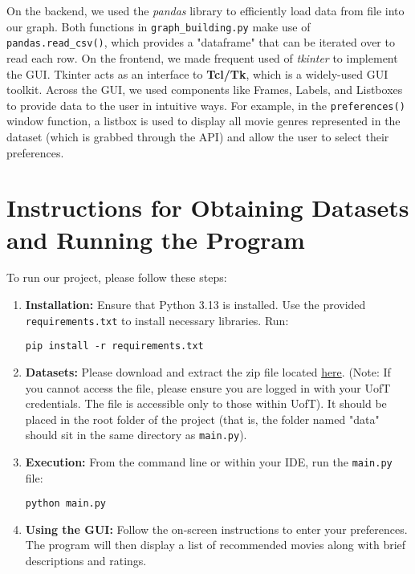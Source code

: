 \documentclass[12pt]{article}
\begin{document}
On the backend, we used the \textit{pandas} library to efficiently load data from file into our graph. Both functions in \texttt{graph\_building.py} make use of \texttt{pandas.read\_csv()}, which provides a "dataframe" that can be iterated over to read each row.
On the frontend, we made frequent used of \textit{tkinter} to implement the GUI. Tkinter acts as an interface to \textbf{Tcl/Tk}, which is a widely-used GUI toolkit. Across the GUI, we used components like Frames, Labels, and Listboxes to provide data to the user in intuitive ways. For example, in the \texttt{preferences()} window function, a listbox is used to display all movie genres represented in the dataset (which is grabbed through the API) and allow the user to select their preferences.

\section{Instructions for Obtaining Datasets and Running the Program}
To run our project, please follow these steps:
\begin{enumerate}
    \item \textbf{Installation:} Ensure that Python 3.13 is installed. Use the provided \texttt{requirements.txt} to install necessary libraries. Run:
    \begin{verbatim}
pip install -r requirements.txt
    \end{verbatim}
    \item \textbf{Datasets:} Please download and extract the zip file located \href{https://utoronto-my.sharepoint.com/:u:/g/personal/aiden_chettleburgh_mail_utoronto_ca/EWullXGtCOpBlOvOkgNzJrgBNfUv2LnhMl_ELSGbOVA1Lw?e=gBJdVQ}{here}. 
    (Note: If you cannot access the file, please ensure you are logged in with your UofT credentials. The file is accessible only to those within UofT).
    It should be placed in the root folder of the project (that is, the folder named "data" should sit in the same directory as \texttt{main.py}).
    \item \textbf{Execution:} From the command line or within your IDE, run the \texttt{main.py} file:
    \begin{verbatim}
python main.py
    \end{verbatim}
    \item \textbf{Using the GUI:} Follow the on-screen instructions to enter your preferences. The program will then display a list of recommended movies along with brief descriptions and ratings.
\end{enumerate}
\end{document}
